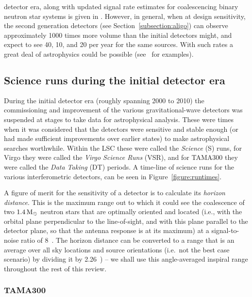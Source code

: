 detector era, along with updated signal rate estimates for coalescencing binary neutron star systems is given 
in \cite{lrr-2016-1}. However, in general, when at design sensitivity, the second generation detectors (see 
Section~\ref{subsection:aligo}) can observe approximately 1000 times more volume than the initial detectors 
might, and expect to see 40, 10, and 20 per year for the same sources. With such rates a great deal of 
astrophysics could be possible (see~\cite{Sathyaprakash:2009} for examples).

\subsection{Science runs during the initial detector era}
\label{subsection:runs} 

During the initial detector era (roughly spanning 2000 to 2010) the commissioning and improvement of the 
various gravitational-wave detectors was suspended at stages to take data for astrophysical analysis. These 
were times when it was considered that the detectors were sensitive and stable enough (or had made sufficient
improvements over earlier states) to make astrophysical searches worthwhile. Within the LSC these were called 
the \textit{Science} (S) runs, for Virgo they were called the \textit{Virgo Science Runs} (VSR), and for 
TAMA300 they were called the \textit{Data Taking} (DT) periods. A time-line of science runs for the various
interferometric detectors, can be seen in Figure~\ref{figure:runtimes}. 

A figure of merit for the sensitivity of a detector is to calculate its \textit{horizon distance}. This is 
the maximum range out to which it could see the coalescence of two $1.4\,{\rm M}_{\odot}$ neutron stars
that are optimally oriented and located (i.e., with the orbital plane perpendicular to the line-of-sight, and 
with this plane parallel to the detector plane, so that the antenna response is at its maximum) at
a signal-to-noise ratio of 8~\cite{Abbott:2005b}. The horizon distance can be converted to a range that is an 
average over all sky locations and source orientations (i.e.\ not the best case scenario) by dividing
it by 2.26~\cite{Sutton:2003}) -- we shall use this angle-averaged inspiral range throughout the rest of this 
review.

\subsubsection{TAMA300}

